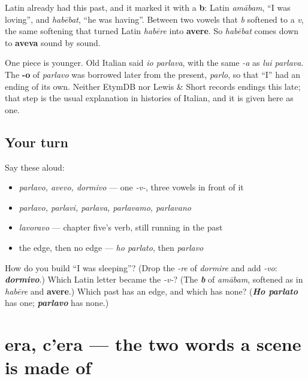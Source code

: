 \begin{cousinweb}
Latin already had this past, and it marked it with a \textbf{b}: Latin \emph{amābam}, \textquotedblleft{}I was loving\textquotedblright{}, and \emph{habēbat}, \textquotedblleft{}he was having\textquotedblright{}. Between two vowels that \emph{b} softened to a \emph{v}, the same softening that turned Latin \emph{habēre} into \textbf{avere}. So \emph{habēbat} comes down to \textbf{aveva} sound by sound.

One piece is younger. Old Italian said \emph{io parlava}, with the same \emph{-a} as \emph{lui parlava}. The \textbf{-o} of \emph{parlavo} was borrowed later from the present, \emph{parlo}, so that \textquotedblleft{}I\textquotedblright{} had an ending of its own. Neither EtymDB nor Lewis \& Short records endings this late; that step is the usual explanation in histories of Italian, and it is given here as one.
\end{cousinweb}

\subsection*{Your turn}
Say these aloud:

\begin{itemize}
\raggedright
  \item \emph{parlavo, avevo, dormivo} — one \emph{-v-}, three vowels in front of it
  \item \emph{parlavo, parlavi, parlava, parlavamo, parlavano}
  \item \emph{lavoravo} — chapter five's verb, still running in the past
  \item the edge, then no edge — \emph{ho parlato}, then \emph{parlavo}
\end{itemize}

\begin{tcolorbox}[breakable,colback=teal!4,colframe=teal!35!black,title={Before you move on}]
How do you build \textquotedblleft{}I was sleeping\textquotedblright{}? (Drop the \emph{-re} of \emph{dormire} and add \emph{-vo}: \emph{\textbf{dormivo}}.) Which Latin letter became the \emph{-v-}? (The \emph{\textbf{b}} of \emph{amābam}, softened as in \emph{habēre} and \textbf{avere}.) Which past has an edge, and which has none? (\emph{\textbf{Ho parlato}} has one; \emph{\textbf{parlavo}} has none.)
\end{tcolorbox}
\section[era, c'era]{era, c'era — the two words a scene is made of}

